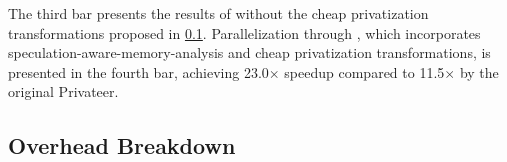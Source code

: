 The third bar presents the results of \name without the cheap
privatization transformations proposed in \ref{}. Parallelization through
\name, which incorporates speculation-aware-memory-analysis and cheap
privatization transformations, is presented in the fourth bar, achieving
23.0$\times$ speedup compared to 11.5$\times$ by the original Privateer.









\subsection{Overhead Breakdown}

